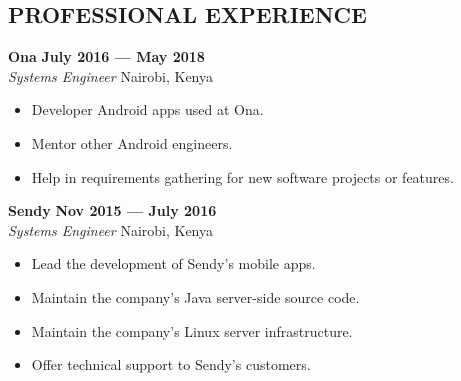 \documentclass{res}
\begin{document}
\thispagestyle{empty} %

\address{P.O. Box 55050(00200) \\ Nairobi, Kenya \\ +254715023805}

\address{jason@rogena.me}


\begin{resume}

	\section{PROFESSIONAL EXPERIENCE}

	\vspace{8pt}
	\textbf{Ona} \hfill        \textbf{July 2016 --- May 2018} \\
	\emph{Systems Engineer}       \hfill  Nairobi, Kenya
	\begin{itemize} \itemsep -2pt %
		\item Developer Android apps used at Ona.
		\item Mentor other Android engineers.
		\item Help in requirements gathering for new software projects or features.
	\end{itemize} \vspace{-4pt}

	\vspace{8pt}
	\textbf{Sendy} \hfill        \textbf{Nov 2015 --- July 2016} \\
	\emph{Systems Engineer}       \hfill Nairobi, Kenya
	\begin{itemize} \itemsep -2pt %
		\item Lead the development of Sendy’s mobile apps.
		\item Maintain the company’s Java server-side source code.
		\item Maintain the company’s Linux server infrastructure.
		\item Offer technical support to Sendy’s customers.
	\end{itemize} \vspace{-4pt}


\end{resume}
\end{document}
